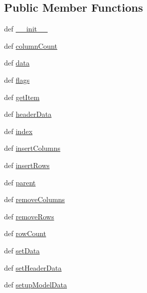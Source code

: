 \subsection*{Public Member Functions}
\begin{DoxyCompactItemize}
\item 
def \hyperlink{classeditabletreemodel_1_1TreeModel_acab1bcbc877aab16ec27aba90a96ecaa}{\+\_\+\+\_\+init\+\_\+\+\_\+}
\item 
def \hyperlink{classeditabletreemodel_1_1TreeModel_aa42566ef270b180ab93750fdbabe7e5e}{column\+Count}
\item 
def \hyperlink{classeditabletreemodel_1_1TreeModel_a8c65754eb393f1d3b015836b4e21e1e3}{data}
\item 
def \hyperlink{classeditabletreemodel_1_1TreeModel_adba7c4d8c570d275f5e4ea3de141ce87}{flags}
\item 
def \hyperlink{classeditabletreemodel_1_1TreeModel_a40d40f0664501f2993f3f34cc4dc433e}{get\+Item}
\item 
def \hyperlink{classeditabletreemodel_1_1TreeModel_afdbc8d71f0a8175fb4e432419bdc5fbf}{header\+Data}
\item 
def \hyperlink{classeditabletreemodel_1_1TreeModel_aa5e44393fba1d2abce6d1d0a040f5bf2}{index}
\item 
def \hyperlink{classeditabletreemodel_1_1TreeModel_a4ca133b7936c57bec510c202531a99eb}{insert\+Columns}
\item 
def \hyperlink{classeditabletreemodel_1_1TreeModel_a778f460c3db2a0d69b5b364776df5c8d}{insert\+Rows}
\item 
def \hyperlink{classeditabletreemodel_1_1TreeModel_adf1bfcbb10bb81656f848ce5d8d609d8}{parent}
\item 
def \hyperlink{classeditabletreemodel_1_1TreeModel_aade5700c3c4df5959206b87cf623e418}{remove\+Columns}
\item 
def \hyperlink{classeditabletreemodel_1_1TreeModel_a5f8df338b121bc17f8c62b983d032920}{remove\+Rows}
\item 
def \hyperlink{classeditabletreemodel_1_1TreeModel_acb6f0ede290fc52effadfd5dffb206fa}{row\+Count}
\item 
def \hyperlink{classeditabletreemodel_1_1TreeModel_a51ff493b46705c6e33fb8e57a29f36e5}{set\+Data}
\item 
def \hyperlink{classeditabletreemodel_1_1TreeModel_a8bf7ef0930c5a186bb9467cfec3cd4db}{set\+Header\+Data}
\item 
def \hyperlink{classeditabletreemodel_1_1TreeModel_a07f9b68c817036387b69bdb284d35496}{setup\+Model\+Data}
\end{DoxyCompactItemize}

